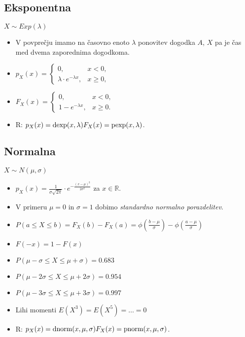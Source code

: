 \subsection{Eksponentna}
$X\sim Exp(\lambda)$
\begin{itemize}[leftmargin=*]
    \item V povpre\v cju imamo na \v casovno enoto $\lambda$ ponovitev dogodka $A$, $X$ pa je \v cas med dvema zaporednima dogodkoma.
    \item $\displaystyle p_X(x)=\left\{\begin{array}{ll} 
    0,	&	x < 0, \\
    \lambda\cdot e^{-\lambda x}, & x\geq 0,
    \end{array}\right.$
    \item $\displaystyle F_X(x)=
    \left\{\begin{array}{ll} 
    0,	&	x < 0, \\
    1- e^{-\lambda x}, & x\geq 0.
    \end{array}\right.$
    \item R: $p_X(x)=\text{dexp}(x,\lambda)\\
     F_X(x)=\text{pexp}(x,\lambda)$.
\end{itemize}



\subsection{Normalna}
$X\sim N(\mu,\sigma)$
\begin{itemize}[leftmargin=*]

\item $\displaystyle p_X(x)=\tfrac{1}{\sigma\sqrt{2\pi}}\cdot
e^{-\tfrac{(x-\mu)^2}{2\sigma^2}}$ za $x\in \mathbb{R}$.
\item V primeru $\mu=0$ in $\sigma=1$ dobimo \textit{standardno normalno porazdelitev}.
\item $P(a\leq X\leq b)=F_X(b)-F_X(a)=\phi(\frac{b-\mu}{\sigma})-\phi(\frac{a-\mu}{\sigma})$
\item $F(-x)=1-F(x)$
\item $P(\mu - \sigma\leq X \leq \mu + \sigma)=0.683$
\item $P(\mu - 2\sigma\leq X \leq \mu + 2\sigma)=0.954$
\item $P(\mu - 3\sigma\leq X \leq \mu + 3\sigma)=0.997$
\item Lihi momenti $E(X^3)=E(X^5)=\dots=0$
\item R: $p_X(x)=\text{dnorm}(x,\mu,\sigma)\\ F_X(x)=\text{pnorm}(x,\mu,\sigma)$.
\end{itemize}



